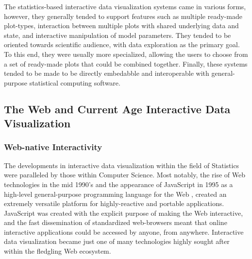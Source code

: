 \documentclass[12pt,a4paper]{article}
\begin{document}
The statistics-based interactive data visualization systems came in various forms, however, they generally tended to support features such as multiple ready-made plot-types, interaction between multiple plots with shared underlying data and state, and interactive manipulation of model parameters. They tended to be oriented towards scientific audience, with data exploration as the primary goal. To this end, they were usually more specialized, allowing the users to choose from a set of ready-made plots that could be combined together. Finally, these systems tended to be made to be directly embedabble and interoperable with general-purpose statistical computing software.      

\subsection{The Web and Current Age Interactive Data Visualization}
\label{sec:currentage}

\subsubsection{Web-native Interactivity}
\label{sec:webinteractivity}

The developments in interactive data visualization within the field of Statistics were paralleled by those within Computer Science. Most notably, the rise of Web technologies in the mid 1990's and the appearance of JavaScript in 1995 as a high-level general-purpose programming language for the Web \citep[for a description of the history, see e.g.][]{wirfs-brock2020}, created an extremely versatile platform for highly-reactive and portable applications. JavaScript was created with the explicit purpose of making the Web interactive, and the fast dissemination of standardized web-browsers meant that online interactive applications could be accessed by anyone, from anywhere. Interactive data visualization became just one of many technologies highly sought after within the fledgling Web ecosystem. 
\end{document}
